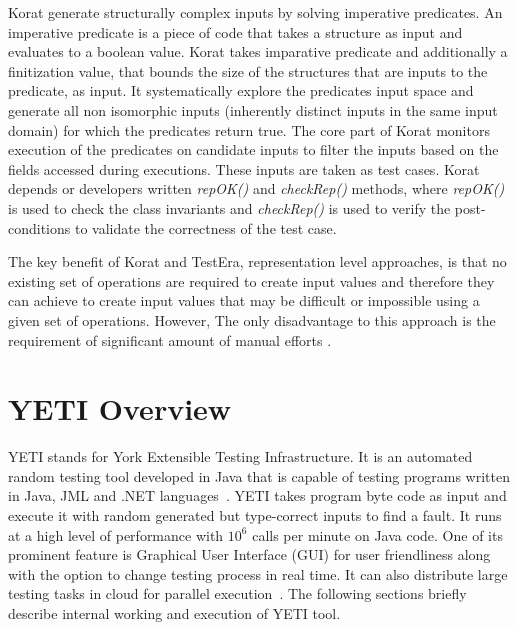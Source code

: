 Korat generate structurally complex inputs by solving imperative predicates. An imperative predicate is a piece of code that takes a structure as input and evaluates to a boolean value. Korat takes imparative predicate and additionally a finitization value, that bounds the size of the structures that are inputs to the predicate, as input. It systematically explore the predicates input space and generate all non isomorphic inputs (inherently distinct inputs in the same input domain) for which the predicates return true. The core part of Korat monitors execution of the predicates on candidate inputs to filter the inputs based on the fields accessed during executions. These inputs are taken as test cases. Korat depends or developers written {\it repOK()} and {\it checkRep()} methods, where {\it repOK()} is used to check the class invariants and {\it checkRep()} is used to verify the post-conditions to validate the correctness of the test case. 

The key benefit of Korat and TestEra, representation level approaches, is that no existing set of operations are required to create input values and therefore they can achieve to create input values that may be difficult or impossible using a given set of operations. However, The only disadvantage to this approach is the requirement of significant amount of manual efforts \cite{pacheco2009directed}.    




\section{YETI Overview}
YETI stands for York Extensible Testing Infrastructure. It is an automated random testing tool developed in Java that is capable of testing programs written in Java, JML and .NET languages~\cite{Oriol2010c}. YETI takes program byte code as input and execute it with random generated but type-correct inputs to find a fault. It runs at a high level of performance with $10^6$ calls per minute on Java code. One of its prominent feature is Graphical User Interface (GUI) for user friendliness along with the option to change testing process in real time. It can also distribute large testing tasks in cloud for parallel execution~\cite{Oriol2010}. The following sections briefly describe internal working and execution of YETI tool. 

